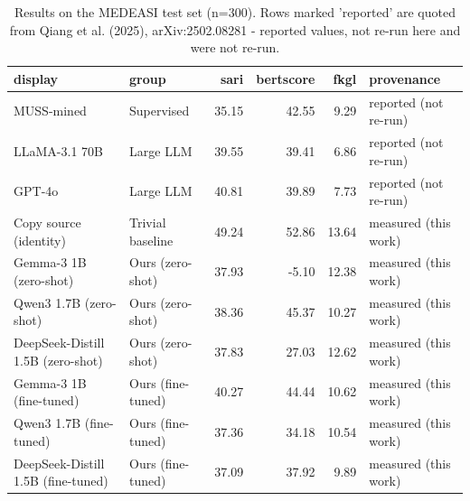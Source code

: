 \begin{table}
\caption{Results on the MEDEASI test set (n=300). Rows marked 'reported' are quoted from Qiang et al. (2025), arXiv:2502.08281 - reported values, not re-run here and were not re-run.}
\label{tab:medeasi}
\begin{tabular}{llrrrl}
\toprule
display & group & sari & bertscore & fkgl & provenance \\
\midrule
MUSS-mined & Supervised & 35.15 & 42.55 & 9.29 & reported (not re-run) \\
LLaMA-3.1 70B & Large LLM & 39.55 & 39.41 & 6.86 & reported (not re-run) \\
GPT-4o & Large LLM & 40.81 & 39.89 & 7.73 & reported (not re-run) \\
Copy source (identity) & Trivial baseline & 49.24 & 52.86 & 13.64 & measured (this work) \\
Gemma-3 1B (zero-shot) & Ours (zero-shot) & 37.93 & -5.10 & 12.38 & measured (this work) \\
Qwen3 1.7B (zero-shot) & Ours (zero-shot) & 38.36 & 45.37 & 10.27 & measured (this work) \\
DeepSeek-Distill 1.5B (zero-shot) & Ours (zero-shot) & 37.83 & 27.03 & 12.62 & measured (this work) \\
Gemma-3 1B (fine-tuned) & Ours (fine-tuned) & 40.27 & 44.44 & 10.62 & measured (this work) \\
Qwen3 1.7B (fine-tuned) & Ours (fine-tuned) & 37.36 & 34.18 & 10.54 & measured (this work) \\
DeepSeek-Distill 1.5B (fine-tuned) & Ours (fine-tuned) & 37.09 & 37.92 & 9.89 & measured (this work) \\
\bottomrule
\end{tabular}
\end{table}
